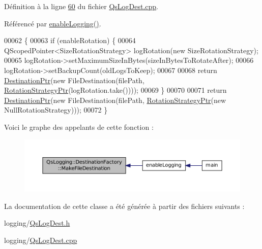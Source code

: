 Définition à la ligne \hyperlink{QsLogDest_8cpp_source_l00060}{60} du fichier \hyperlink{QsLogDest_8cpp_source}{Qs\-Log\-Dest.\-cpp}.



Référencé par \hyperlink{main_8cpp_ac3c79e35c4fc5c50939ae90485e1483f}{enable\-Logging()}.


\begin{DoxyCode}
00062 \{
00063     \textcolor{keywordflow}{if} (enableRotation) \{
00064         QScopedPointer<SizeRotationStrategy> logRotation(\textcolor{keyword}{new} SizeRotationStrategy);
00065         logRotation->setMaximumSizeInBytes(sizeInBytesToRotateAfter);
00066         logRotation->setBackupCount(oldLogsToKeep);
00067 
00068         \textcolor{keywordflow}{return} \hyperlink{namespaceQsLogging_a8fe41cf859d617f1c23515f804d1e8ec}{DestinationPtr}(\textcolor{keyword}{new} FileDestination(filePath, 
      \hyperlink{namespaceQsLogging_a41dc81d39cd3d36d9e15746bd9174be0}{RotationStrategyPtr}(logRotation.take())));
00069     \}
00070 
00071     \textcolor{keywordflow}{return} \hyperlink{namespaceQsLogging_a8fe41cf859d617f1c23515f804d1e8ec}{DestinationPtr}(\textcolor{keyword}{new} FileDestination(filePath, 
      \hyperlink{namespaceQsLogging_a41dc81d39cd3d36d9e15746bd9174be0}{RotationStrategyPtr}(\textcolor{keyword}{new} NullRotationStrategy)));
00072 \}
\end{DoxyCode}


Voici le graphe des appelants de cette fonction \-:
\nopagebreak
\begin{figure}[H]
\begin{center}
\leavevmode
\includegraphics[width=350pt]{classQsLogging_1_1DestinationFactory_abc128b6640d5716b91c681df960b878c_icgraph}
\end{center}
\end{figure}




La documentation de cette classe a été générée à partir des fichiers suivants \-:\begin{DoxyCompactItemize}
\item 
logging/\hyperlink{QsLogDest_8h}{Qs\-Log\-Dest.\-h}\item 
logging/\hyperlink{QsLogDest_8cpp}{Qs\-Log\-Dest.\-cpp}\end{DoxyCompactItemize}
